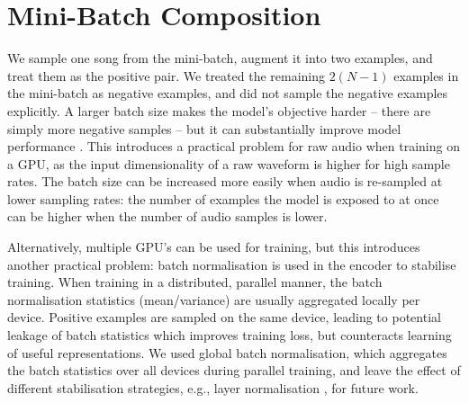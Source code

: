 \section{Mini-Batch Composition} %
We sample one song from the mini-batch, augment it into two examples, and treat them as the positive pair.
We treated the remaining $2(N-1)$ examples in the mini-batch as negative examples, and did not sample the negative examples explicitly.
A larger batch size makes the model's objective harder -- there are simply more negative samples -- but it can substantially improve model performance \cite{chen_simple_2020}.
This introduces a practical problem for raw audio when training on a GPU, as the input dimensionality of a raw waveform is higher for high sample rates.
The batch size can be increased more easily when audio is re-sampled at lower sampling rates: the number of examples the model is exposed to at once can be higher when the number of audio samples is lower.

Alternatively, multiple GPU's can be used for training, but this introduces another practical problem: batch normalisation \cite{batch_normalisation} is used in the encoder to stabilise training.
When training in a distributed, parallel manner, the batch normalisation statistics (mean/variance) are usually aggregated locally per device.
Positive examples are sampled on the same device, leading to potential leakage of batch statistics which improves training loss, but counteracts learning of useful representations.
We used global batch normalisation, which aggregates the batch statistics over all devices during parallel training, and leave the effect of different stabilisation strategies, e.g., layer normalisation \cite{henaff2019data}, for future work.


